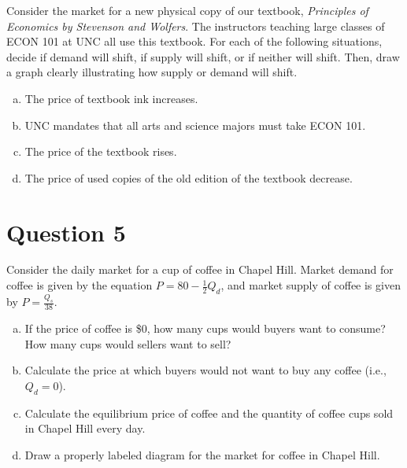 \documentclass{article}
\newcommand{\question}[1]{\pagebreak\section{Question #1}}
\begin{document}
Consider the market for a new physical copy of our textbook, \emph{Principles of Economics by Stevenson and Wolfers}. The instructors teaching large classes of ECON 101 at UNC all use this textbook. For each
of the following situations, decide if demand will shift, if supply will
shift, or if neither will shift. Then, draw a graph clearly illustrating
how supply or demand will shift.
\begin{enumerate}[(a)]
    \item The price of textbook ink increases.

    \item UNC mandates that all arts and science majors must take ECON
101.

    \item The price of the textbook rises.

    \item The price of used copies of the old edition of the textbook decrease.
\end{enumerate}

\question{5}

Consider the daily market for a cup of coffee in Chapel Hill. Market
demand for coffee is given by the equation \(P = 80 - \frac{1}{2}Q_d\), and market
supply of coffee is given by \(P = \frac{Q_s}{38}\).
\begin{enumerate}[(a)]
    \item If the price of coffee is \$0, how many cups would buyers want to
consume? How many cups would sellers want to sell?

    \item Calculate the price at which buyers would not want to buy any
coffee (i.e., \(Q_d = 0\)).

    \item Calculate the equilibrium price of coffee and the quantity of coffee
cups sold in Chapel Hill every day.

    \item Draw a properly labeled diagram for the market for coffee in
Chapel Hill.

\end{enumerate}
\end{document}
